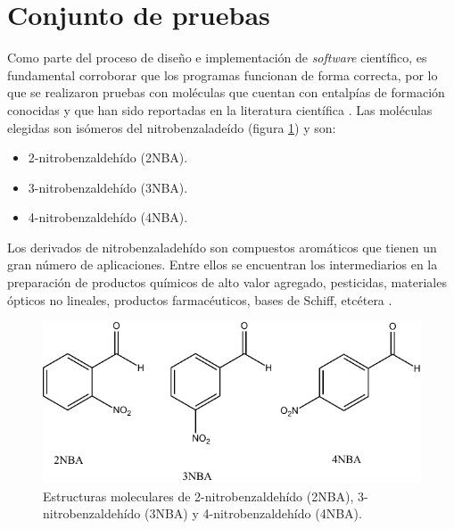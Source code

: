 \section{Conjunto de pruebas}

Como parte del proceso de diseño e implementación  de \textit{software} científico, es fundamental corroborar que los programas funcionan de forma correcta, por lo que se realizaron pruebas con moléculas que cuentan con entalpías de formación conocidas y que han sido reportadas en la literatura científica \cite{Ximello2020}. Las moléculas elegidas son isómeros del nitrobenzaladeído (figura \ref{n-NBA}) y son:

\begin{itemize}
\item 2-nitrobenzaldeh\'{i}do (2NBA).
\item 3-nitrobenzaldeh\'{i}do (3NBA).
\item 4-nitrobenzaldeh\'{i}do (4NBA).
\end{itemize}

Los derivados de nitrobenzaladeh\'{i}do son compuestos aromáticos que tienen un gran número de aplicaciones. Entre ellos se encuentran los intermediarios en la preparación de productos químicos de alto valor agregado, pesticidas, materiales ópticos no lineales, productos farmacéuticos, bases de Schiff, etcétera \cite{Ximello2020}.

\begin{figure}[hbtp]
\begin{center}
\includegraphics[width=\textwidth]{graphs/n-NBA.pdf}
\caption{Estructuras moleculares de 2-nitrobenzaldeh\'{i}do (2NBA), 3-nitrobenzaldeh\'{i}do (3NBA) y 4-nitrobenzaldeh\'{i}do (4NBA).}
\label{n-NBA}
\end{center}
\end{figure}

